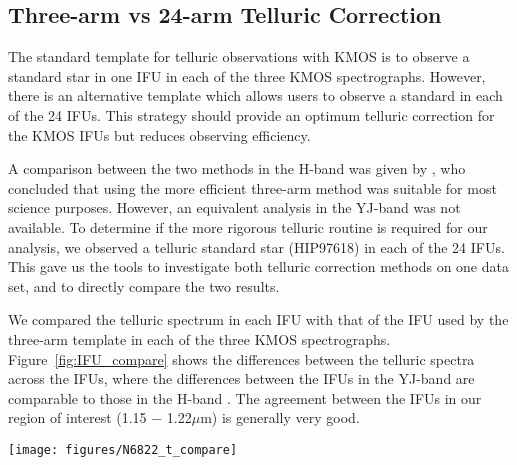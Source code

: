\documentclass[iop]{emulateapj}
\begin{document}
\subsection{Three-arm vs 24-arm Telluric Correction} %
\label{sub:three_arm_vs_24_arm_telluric_correction}

The standard template for telluric observations with KMOS is to observe a standard star in one IFU in each of the three KMOS spectrographs.
However, there is an alternative template which allows users to observe a standard in each of the 24 IFUs.
This strategy should provide an optimum telluric correction for the KMOS IFUs but reduces observing efficiency.

A comparison between the two methods in the H-band was given by
\cite{2013A&A...558A..56D},
who concluded that using the more efficient three-arm method was suitable for most science purposes.
However, an equivalent analysis in the YJ-band was not available.
To determine if the more rigorous telluric routine is required for our analysis,
we observed a telluric standard star (HIP97618) in each of the 24 IFUs.
This gave us the tools to investigate both telluric correction methods on one data set,
and to directly compare the two results.

We compared the telluric spectrum in each IFU with that of the IFU used by the three-arm template in each of the three KMOS spectrographs.
Figure~\ref{fig:IFU_compare} shows the differences between the telluric spectra across the IFUs,
where the differences between the IFUs in the YJ-band are comparable to those in the H-band
\cite[cf. Fig.7 from][]{2013A&A...558A..56D}.
The agreement between the IFUs in our region of interest (1.15 $-$ 1.22$\mu$m) is generally very good.


\begin{figure*}
 \begin{center}
 \texttt{[image: figures/N6822\_t\_compare]}
 \caption{
    Comparison of J-band spectra of the same standard star in each IFU.
    The ratio of each spectrum compared to that from the IFU used in the three-arm telluric method is shown,
    with their respective mean and standard deviation ($\mu$ and $\sigma$).
    Red lines indicate $\mu$~=~1.0, $\sigma$~=~0.0 for each ratio.
    Blue shaded area signifies region where the J-band analysis fitting takes place.
    Within this region, in general, the discrepancies between the IFUs is small.
    This is reflected in the standard deviation values when only considering this region.
    IFUs 13 and 16 are omitted as no data was taken with these IFUs. \label{fig:IFU_compare}
          }
 \end{center}
\end{figure*}
\end{document}
